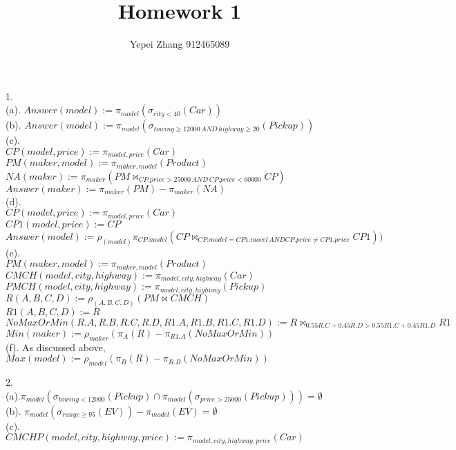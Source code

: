 \documentclass[12pt]{article}
\title{Homework 1}
\author{Yepei Zhang 912465089}
\begin{document}
\maketitle

\par
1.\\
(a). $Answer(model):=\pi_{model}(\sigma_{city<40}(Car))$\\
(b). $Answer(model):=\pi_{model}(\sigma_{towing\geq 12000\, AND\, highway\geq 20}(Pickup))$\\
(c). \\
 $CP(model,price):=\pi_{model,price}(Car)$\\
 $PM(maker,model):=\pi_{maker,model}(Product)$\\
 $NA(maker):=\pi_{maker}(PM \bowtie_{CP.price>25000\, AND\, CP.price<60000} CP)$\\
 $Answer(maker):=\pi_{maker}(PM)-\pi_{maker}(NA)$\\
(d). \\
$CP(model,price):=\pi_{model,price}(Car)$\\
$CP1(model,price):=CP$\\
$Answer(model):=\rho_{(model)} \pi_{CP.model}(CP \bowtie_{CP.model=CP1.mocel \, AND CP.price \neq CP1.price} CP1))$\\
(e). \\
$PM(maker,model):=\pi_{maker,model}(Product)$\\
$CMCH(model, city, highway):=\pi_{model,city,highway}(Car)$\\
$PMCH(model,city,highway):=\pi_{model,city,highway}(Pickup)$\\
$R(A,B,C,D):=\rho_{(A,B,C,D)}(PM \bowtie CMCH)$\\
$R1(A,B,C,D):=R$\\
$NoMaxOrMin(R.A,R.B,R.C,R.D,R1.A,R1.B,R1.C,R1.D):= R \bowtie_{0.55R.C+0.45R.D>0.55R1.C+0.45R1.D} R1$\\
$Min(maker):=\rho_{maker}(\pi_{A}(R)-\pi_{R1.A}(NoMaxOrMin))$\\
(f). As discussed above, $Max(model):=\rho_{model}(\pi_{B}(R)-\pi_{R.B}(NoMaxOrMin))$\\
\par
2.\\
(a).$\pi_{model}(\sigma_{towing<12000}(Pickup)\cap \pi_{model}(\sigma_{price>25000}(Pickup)))=\emptyset$\\
(b). $\pi_{model}(\sigma_{range \geqslant 95}(EV))-\pi_{model}(EV)=\emptyset$\\
(c). \\
$CMCHP(model,city,highway,price):=\pi_{model,city,highway,price}(Car)$\\
\end{document}
